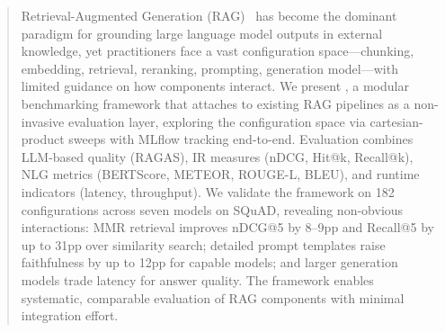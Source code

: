 \begin{abstract}
Retrieval-Augmented Generation (RAG)~\cite{lewis2020retrieval} has become the dominant paradigm for grounding large language model outputs in external knowledge, yet practitioners face a vast configuration space---chunking, embedding, retrieval, reranking, prompting, generation model---with limited guidance on how components interact. We present \toolname{}, a modular benchmarking framework that attaches to existing RAG pipelines as a non-invasive evaluation layer, exploring the configuration space via cartesian-product sweeps with MLflow tracking end-to-end. Evaluation combines LLM-based quality (RAGAS), IR measures (nDCG, Hit@k, Recall@k), NLG metrics (BERTScore, METEOR, ROUGE-L, BLEU), and runtime indicators (latency, throughput). We validate the framework on 182 configurations across seven models on SQuAD, revealing non-obvious interactions: MMR retrieval improves nDCG@5 by 8--9pp and Recall@5 by up to 31pp over similarity search; detailed prompt templates raise faithfulness by up to 12pp for capable models; and larger generation models trade latency for answer quality. The framework enables systematic, comparable evaluation of RAG components with minimal integration effort.

\end{abstract}
